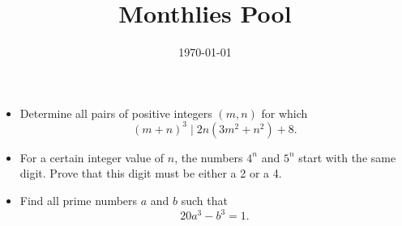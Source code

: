 \documentclass[12pt]{article}
\title{Monthlies Pool}
\author{\today}
\date{}
\begin{document}
 \maketitle

\begin{itemize}

\item %
Determine all pairs of positive integers $(m,n)$ for which
	\[(m+n)^3 \mid 2n(3m^2+n^2) + 8.\]


\item %
For a certain integer value of $n$, the numbers $4^n$ and $5^n$ start with the same digit. Prove that this digit must be either a 2 or a 4.


\item %
Find all prime numbers $a$ and $b$ such that \[ 20a^3 -b^3 = 1. \]


\end{itemize}
\end{document}
